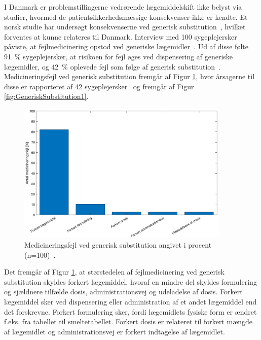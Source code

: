 I Danmark er problemstillingerne vedrørende lægemiddelskift ikke belyst via studier, hvormed de patientsikkerhedsmæssige konsekvenser ikke er kendte. Et norsk studie har undersøgt konsekvenserne ved generisk substitution~\citep{Hakonsen2010}, hvilket forventes at kunne relateres til Danmark. Interview med 100 sygeplejersker påviste, at fejlmedicinering opstod ved generiske lægemidler~\citep{Hakonsen2010}. Ud af disse følte %
91~\% sygeplejersker, at risikoen for fejl øges ved dispensering af generiske lægemidler, og 42~\% oplevede fejl som følge af generisk substitution~\citep{Hakonsen2010}.
Medicineringsfejl ved generisk substitution fremgår af Figur \ref{fig:GeneriskSubstitution}, hvor årsagerne til disse er rapporteret af 42 sygeplejersker~\citep{Hakonsen2010} og fremgår af Figur \ref{fig:GeneriskSubstitution1}.

\begin{figure}[H]\centering	\includegraphics[width=0.9\textwidth]{billeder/GenSubb.png} 
	\caption{Medicineringsfejl ved generisk substitution angivet i procent (n=100)~\citep{Hakonsen2010}.}
	\label{fig:GeneriskSubstitution}  
\end{figure}
\vspace{-0.5cm}

Det fremgår af Figur \ref{fig:GeneriskSubstitution}, at  størstedelen af fejlmedicinering ved generisk substitution skyldes forkert lægemiddel, hvoraf en mindre del skyldes formulering og sjældnere tilfælde dosis, administrationsvej og udeladelse af dosis. Forkert lægemiddel sker ved dispensering eller administration af et andet lægemiddel end det forskrevne. Forkert formulering sker, fordi lægemidlets fysiske form er ændret f.eks. fra tabellet til smeltetabellet. Forkert dosis er relateret til forkert mængde af lægemidlet og administrationsvej er forkert indtagelse af lægemidlet. 

